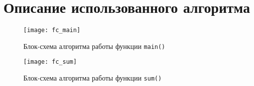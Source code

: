 \section{Описание использованного алгоритма}

\begin{figure}[H]
  \centering
  \texttt{[image: fc\_main]}
  \caption{Блок-схема алгоритма работы функции \texttt{main()}}
\end{figure}

\begin{figure}[H]
  \centering
  \texttt{[image: fc\_sum]}
  \caption{Блок-схема алгоритма работы функции \texttt{sum()}}
\end{figure}
